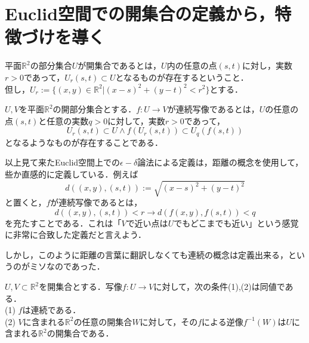 \documentclass[uplatex, 12pt, dvipdfmx]{jsreport}
\begin{document}
\section{Euclid空間での開集合の定義から，特徴づけを導く}

\begin{shadebox}\begin{definition}
    平面$\mathbb{R}^2$の部分集合$U$が開集合であるとは，$U$内の任意の点$(s,t)$に対し，実数$r>0$であって，$U_r(s,t)\subset U$となるものが存在するということ．\\
    但し，$U_r := \{ (x,y)\in\mathbb{R}^2 | (x-s)^2 + (y-t)^2 < r^2 \}$とする．
\end{definition}\end{shadebox}

\begin{shadebox}\begin{definition}
    $U,V$を平面$\mathbb{R}^2$の開部分集合とする．$f:U\rightarrow V$が連続写像であるとは，$U$の任意の点$(s,t)$と任意の実数$q>0$に対して，実数$r>0$であって，$$U_r(s,t)\subset U \wedge f(U_r(s,t))\subset U_q(f(s,t))$$となるようなものが存在することである．
\end{definition}\end{shadebox}

以上見て来たEuclid空間上での$\epsilon -\delta$論法による定義は，距離の概念を使用して，些か直感的に定義している．例えば$$d((x,y),(s,t)):=\sqrt{(x-s)^2+(y-t)^2}$$と置くと，$f$が連続写像であるとは，$$d((x,y),(s,t))<r\rightarrow d(f(x,y),f(s,t))<q$$を充たすことである．これは「$V$で近い点は$U$でもどこまでも近い」という感覚に非常に合致した定義だと言えよう．\par
しかし，このように距離の言葉に翻訳しなくても連続の概念は定義出来る，というのがミソなのであった．

\begin{shadebox}\begin{definition}[連続写像の特徴付け]
    $U,V\subset\mathbb{R}^2$を開集合とする．写像$f:U\rightarrow V$に対して，次の条件(1),(2)は同値である．\\
    (1) $f$は連続である．\\
    (2) $V$に含まれる$\mathbb{R}^2$の任意の開集合$W$に対して，その$f$による逆像$f^{-1}(W)$は$U$に含まれる$\mathbb{R}^2$の開集合である．
\end{definition}\end{shadebox}
\end{document}
